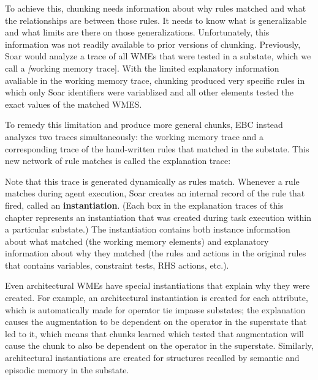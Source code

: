 To achieve this, chunking needs information about why rules matched and what the relationships are between those rules.  It needs to know what is generalizable and what limits are there on those generalizations. Unfortunately, this information was not readily available to prior versions of chunking.  Previously, Soar would analyze a trace of all WMEs that were tested in a substate, which we call a \textit[working memory trace].  With the limited explanatory information avaliable in the working memory trace, chunking produced very specific rules in which only Soar identifiers were variablized and all other elements tested the exact values of the matched WMES.  

To remedy this limitation and produce more general chunks, EBC instead analyzes two traces simultaneously:  the working memory trace and a corresponding trace of the hand-written rules that matched in the substate.  This new network of rule matches is called the explanation trace:

\vspace{12pt}
\begin{center}
	\captionsetup{type=figure}
	\centering{}
	\caption{A close-up of a trace showing differences between a working memory trace (left) vs an explanation trace (right).  The working memory trace only contains the literal values of the WMEs that matched.  The explanation trace, on the other hand, contains variables and various constraints on the values those variables can hold.}
	\label{fig:chunking-wm-vs-exp}
\end{center}

Note that this trace is generated dynamically as rules match.  Whenever a rule matches during agent execution, Soar creates an internal record of the rule that fired, called an \textbf{instantiation}.  (Each box in the explanation traces of this chapter represents an instantiation that was created during task execution within a particular substate.) The instantiation contains both instance information about what matched (the working memory elements) and explanatory information about why they matched (the rules and actions in the original rules that contains variables, constraint tests, RHS actions, etc.).  

Even architectural WMEs have special instantiations that explain why they were created.  For example, an architectural instantiation is created for each  attribute, which is automatically made for operator tie impasse substates; the explanation causes the  augmentation to be dependent on the operator in the superstate that led to it, which means that chunks learned which tested that  augmentation will cause the chunk to also be dependent on the operator in the superstate.  Similarly, architectural instantiations are created for structures recalled by semantic and episodic memory in the substate. 

